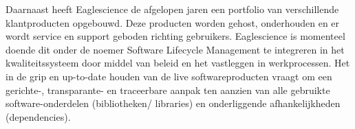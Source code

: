 Daarnaast heeft Eaglescience de afgelopen jaren een portfolio van verschillende klantproducten opgebouwd. Deze producten worden gehost, onderhouden en er wordt service en support geboden richting gebruikers. Eaglescience is momenteel doende dit onder de noemer Software Lifecycle Management te integreren in het kwaliteitssysteem door middel van beleid en het vastleggen in werkprocessen. Het in de grip en up-to-date houden van de live softwareproducten vraagt om een gerichte-, transparante- en traceerbare aanpak ten aanzien van alle gebruikte software-onderdelen (bibliotheken/ libraries) en onderliggende afhankelijkheden (dependencies).



